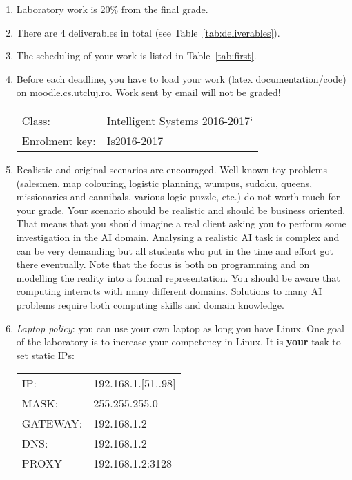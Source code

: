 \begin{enumerate}
 \item Laboratory work is 20\% from the final grade. 
 \item There are 4 deliverables in total (see Table~\ref{tab:deliverables}).
\item The scheduling of your work is listed in Table~\ref{tab:first}.
\item Before each deadline, you have to load your work (latex documentation/code) on moodle.cs.utcluj.ro. Work sent by email will not be graded!

\begin{center}
\begin{tabular}{ll}
Class: & Intelligent Systems 2016-2017`\\
Enrolment key: & Is2016-2017\\
\end{tabular}

\end{center}


\item Realistic and original scenarios are encouraged. 
Well known toy problems (salesmen, map colouring, logistic planning, wumpus, sudoku, queens, missionaries and cannibals, various logic puzzle, etc.) do not worth much for your grade. 
Your scenario should be realistic and should be business oriented. 
That means that you should imagine a real client asking you to perform some investigation in the AI domain.
Analysing a realistic AI task is complex and can be very
demanding but all students who put in the time and effort got there eventually.
Note that the focus is both on programming and on modelling the reality into a formal representation.
You should be aware that computing interacts with many different domains. 
Solutions to many AI problems require both computing skills and domain knowledge.


\item {\it Laptop policy}: you can use your own laptop as long you have Linux. One goal of the laboratory is to increase your competency in Linux. It is \textbf{your} task to set static IPs:
\begin{center}
\begin{tabular}{ll}
IP: & 192.168.1.[51..98] \\%
MASK:&  255.255.255.0\\
GATEWAY:&  192.168.1.2\\
DNS:& 192.168.1.2\\
PROXY & 192.168.1.2:3128\\
\end{tabular}


\end{center}
\end{enumerate}
